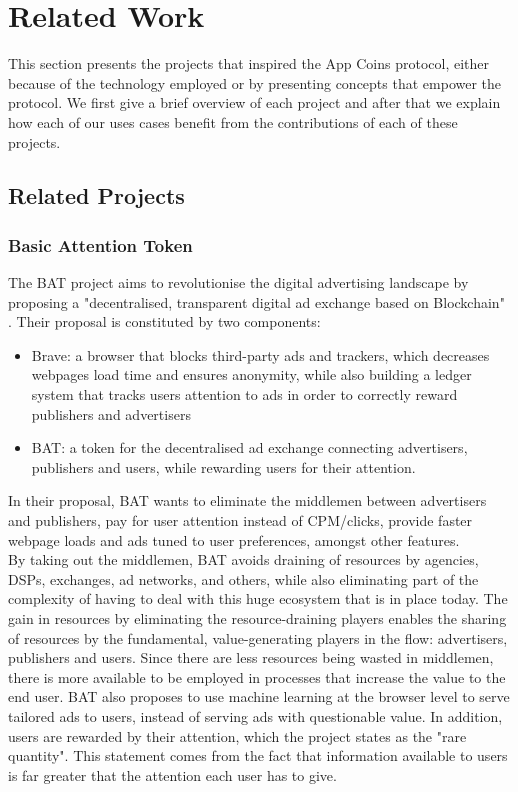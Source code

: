 \section{Related Work}

\label{sec:related}

This section presents the projects that inspired the App Coins protocol, either because of the technology employed or by presenting concepts that empower the protocol. We first give a brief overview of each project and after that we explain how each of our uses cases benefit from the contributions of each of these projects.

\subsection{Related Projects}
\subsubsection{Basic Attention Token}

The BAT project aims to revolutionise the digital advertising landscape by proposing a "decentralised, transparent digital ad exchange based on Blockchain" \cite{BAT}. Their proposal is constituted by two components:
\begin{itemize}
	\item Brave: a browser that blocks third-party ads and trackers, which decreases webpages load time and ensures anonymity, while also building a ledger system that tracks users attention to ads in order to correctly reward publishers and advertisers
	\item BAT: a token for the decentralised ad exchange connecting advertisers, publishers and users, while rewarding users for their attention.
\end{itemize}

In their proposal, BAT wants to eliminate the middlemen between advertisers and publishers, pay for user attention instead of CPM/clicks, provide faster webpage loads and ads tuned to user preferences, amongst other features. \\

By taking out the middlemen, BAT avoids draining of resources by agencies, DSPs, exchanges, ad networks, and others, while also eliminating part of the complexity of having to deal with this huge ecosystem that is in place today. The gain in resources by eliminating the resource-draining players enables the sharing of resources by the fundamental, value-generating  players in the flow: advertisers, publishers and users. Since there are less resources being wasted in middlemen, there is more available to be employed in processes that increase the value to the end user. BAT also proposes to use machine learning at the browser level to serve tailored ads to users, instead of serving ads with questionable value. In addition, users are rewarded by their attention, which the project states as the "rare quantity". This statement comes from the fact that information available to users is far greater that the attention each user has to give. \\

